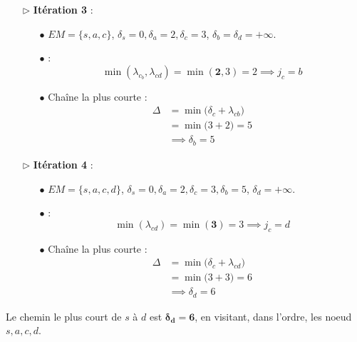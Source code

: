 \documentclass{report}
\def\blankpage{%
      \clearpage%
      \thispagestyle{empty}%
      \addtocounter{page}{-1}%
      \null%
      \clearpage}
\begin{document}
\begin{multicols*}{2}
\begin{itemize}
    \item[\( \rhd \)] \textbf{Itération 3} :
        \begin{itemize}
            \item[\( \bullet \)] \( EM = \{ s, a, c \} \), \( \delta_s = 0, \delta_a = 2, \delta_c = 3\), \( \delta_b = \delta_d = +\infty \).
            \item[\( \bullet \)]  :
                \[
                    \min(\lambda_{c_b}, \lambda_{cd}) =  
                    \min(\boldsymbol{2}, 3  ) = 2 \implies j_c = b
                \]
            \item[\( \bullet \)] Chaîne la plus courte :
                \begin{align*}
                    \Delta &= \min\bigl( \delta_c + \lambda_{cb} \bigr) \\
                           &= \min\bigl( 3 + 2 \bigr) = 5  \\ 
                           &\implies \delta_b = 5 
                \end{align*}
        \end{itemize}  
    \item[\( \rhd \)] \textbf{Itération 4} :
        \begin{itemize}
            \item[\( \bullet \)] \( EM = \{ s, a, c, d \} \), \( \delta_s = 0, \delta_a = 2, \delta_c = 3,  \delta_b= 5\), \(  \delta_d = +\infty \).
            \item[\( \bullet \)]  :
                \[
                    \min(\lambda_{cd}) =  
                    \min( \boldsymbol{3}) = 3\implies j_c = d
                \]
            \item[\( \bullet \)] Chaîne la plus courte :
                \begin{align*}
                    \Delta &= \min\bigl( \delta_c + \lambda_{cd} \bigr) \\
                           &= \min\bigl( 3 + 3 \bigr) = 6  \\ 
                           &\implies \delta_d = 6 
                \end{align*}
        \end{itemize} \end{itemize}

        Le chemin le plus court de $s$ à $d$ est $\boldsymbol{\delta_d = 6}$, en 
        visitant, dans l'ordre, les noeud $s, a, c, d$. 

\blankpage




\end{multicols*}
\end{document}
